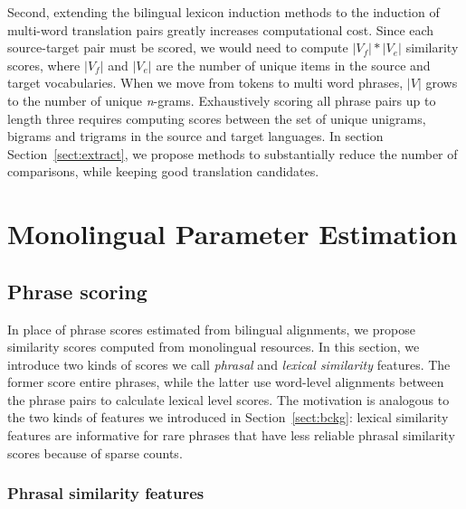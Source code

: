 \documentclass[11pt]{article}
\newcommand{\secref}[1]{Section~\ref{#1}}
\begin{document}
Second, extending the bilingual lexicon induction methods to the induction of multi-word translation pairs greatly increases computational cost. Since each source-target pair must be scored, we would need to compute $|V_{f}| * |V_{e}|$ similarity scores, where $|V_{f}|$ and $|V_{e}|$ are the number of unique items in the source and target vocabularies. When we move from tokens to multi word phrases, $|V|$ grows to the number of unique {\it n}-grams. Exhaustively scoring all phrase pairs up to length three requires computing scores between the set of unique unigrams, bigrams and trigrams in the source and target languages.  In section \secref{sect:extract}, we propose methods to substantially reduce the number of comparisons, while keeping good translation candidates.


\section{Monolingual Parameter Estimation} \label{sect:mono}

\subsection{Phrase scoring} \label{sect:score}

In place of phrase scores estimated from bilingual alignments, we propose similarity scores computed  from monolingual resources.  In this section, we introduce two kinds of scores we call {\em phrasal} and {\em lexical similarity} features.  The former score entire phrases, while the latter use word-level alignments between the phrase pairs to calculate lexical level scores.  The motivation is analogous to the two kinds of features we introduced in \secref{sect:bckg}: lexical similarity features are informative for rare phrases that have less reliable phrasal similarity scores because of sparse counts. 

\subsubsection{Phrasal similarity features} \label{sect:phrasalfeats}
\end{document}
